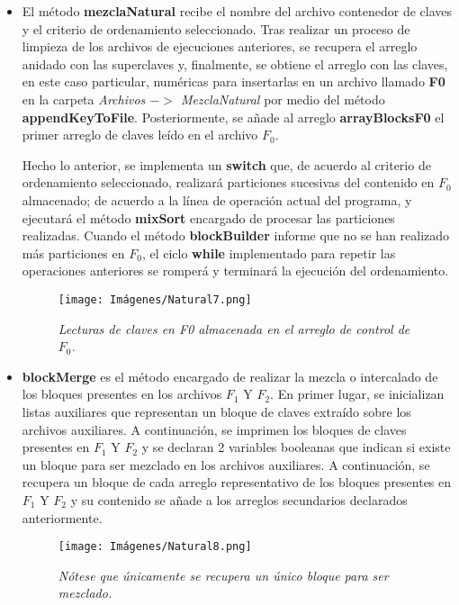 \documentclass[letterpaper,12pt]{extarticle}
\begin{document}
\begin{itemize}
\item El método \textbf{mezclaNatural} recibe el nombre del archivo contenedor de claves y el criterio de ordenamiento seleccionado. Tras realizar un proceso de limpieza de los archivos de ejecuciones anteriores, se recupera el arreglo anidado con las superclaves  y, finalmente, se obtiene el arreglo con las claves, en este caso particular, numéricas para insertarlas en un archivo llamado \textbf{F0} en la carpeta \textit{Archivos $->$ MezclaNatural} por medio del método \textbf{appendKeyToFile}. Posteriormente, se añade al arreglo \textbf{arrayBlocksF0} el primer arreglo de claves leído en el archivo $F_{0}$.

Hecho lo anterior, se implementa un \textbf{switch} que, de acuerdo al criterio de ordenamiento seleccionado, realizará particiones sucesivas del contenido en $F_{0}$ almacenado; de acuerdo a la línea de operación actual del programa, y ejecutará el método \textbf{mixSort} encargado de procesar las particiones realizadas. Cuando el método \textbf{blockBuilder} informe que no se han realizado más particiones en $F_{0}$, el ciclo \textbf{while} implementado para repetir las operaciones anteriores se romperá y terminará la ejecución del ordenamiento.

\begin{figure}[h!]
    \centering
    \texttt{[image: Imágenes/Natural7.png]}
    \caption{\textit{Lecturas de claves en F0 almacenada en el arreglo de control de $F_{0}$.}}
    \label{fig:Natural7}
    \end{figure} 

\item \textbf{blockMerge} es el método encargado de realizar la mezcla o intercalado de los bloques presentes en los archivos $F_{1}$ Y $F_{2}$. En primer lugar, se inicializan listas auxiliares que representan un bloque de claves extraído sobre los archivos auxiliares. A continuación, se imprimen los bloques de claves presentes en $F_{1}$ Y $F_{2}$ y se declaran 2 variables booleanas que indican si existe un bloque para ser mezclado en los archivos auxiliares. A continuación, se recupera un bloque de cada arreglo representativo de los bloques presentes en $F_{1}$ Y $F_{2}$ y su contenido se añade a los arreglos secundarios declarados anteriormente.

\begin{figure}[h!]
    \centering
    \texttt{[image: Imágenes/Natural8.png]}
    \caption{\textit{Nótese que únicamente se recupera un único bloque para ser mezclado.}}
    \label{fig:Natural8}
    \end{figure} 
    

\end{itemize}
\end{document}
